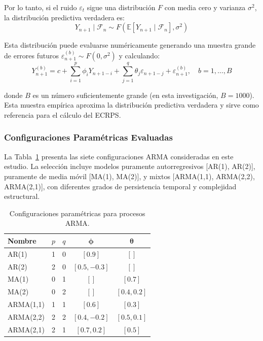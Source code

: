 Por lo tanto, si el ruido $\varepsilon_t$ sigue una distribución $F$ con media cero y varianza $\sigma^2$, la distribución predictiva verdadera es:
\begin{equation}
Y_{n+1} \mid \mathcal{F}_n \sim F\left(\mathbb{E}[Y_{n+1} \mid \mathcal{F}_n], \sigma^2\right)
\label{eq:arma_predictive_distribution}
\end{equation}

Esta distribución puede evaluarse numéricamente generando una muestra grande de errores futuros $\varepsilon_{n+1}^{(b)} \sim F(0, \sigma^2)$ y calculando:
\begin{equation}
Y_{n+1}^{(b)} = c + \sum_{i=1}^p \phi_i Y_{n+1-i} + \sum_{j=1}^q \theta_j \varepsilon_{n+1-j} + \varepsilon_{n+1}^{(b)}, \quad b = 1, \ldots, B
\label{eq:arma_monte_carlo_samples}
\end{equation}

donde $B$ es un número suficientemente grande (en esta investigación, $B = 1000$). Esta muestra empírica aproxima la distribución predictiva verdadera y sirve como referencia para el cálculo del ECRPS.

\subsubsection{Configuraciones Paramétricas Evaluadas}

La Tabla~\ref{tab:arma_configs} presenta las siete configuraciones ARMA consideradas en este estudio. La selección incluye modelos puramente autorregresivos [AR(1), AR(2)], puramente de media móvil [MA(1), MA(2)], y mixtos [ARMA(1,1), ARMA(2,2), ARMA(2,1)], con diferentes grados de persistencia temporal y complejidad estructural.

\begin{table}[htbp]
\centering
\caption{Configuraciones paramétricas para procesos ARMA.}
\label{tab:arma_configs}
\begin{tabular}{lcccc}
\toprule
\textbf{Nombre} & \textbf{$p$} & \textbf{$q$} & \textbf{$\boldsymbol{\phi}$} & \textbf{$\boldsymbol{\theta}$} \\
\midrule
AR(1)     & 1 & 0 & $[0.9]$              & $[]$           \\
AR(2)     & 2 & 0 & $[0.5, -0.3]$        & $[]$           \\
MA(1)     & 0 & 1 & $[]$                 & $[0.7]$        \\
MA(2)     & 0 & 2 & $[]$                 & $[0.4, 0.2]$   \\
ARMA(1,1) & 1 & 1 & $[0.6]$              & $[0.3]$        \\
ARMA(2,2) & 2 & 2 & $[0.4, -0.2]$        & $[0.5, 0.1]$   \\
ARMA(2,1) & 2 & 1 & $[0.7, 0.2]$         & $[0.5]$        \\
\bottomrule
\end{tabular}
\end{table}

